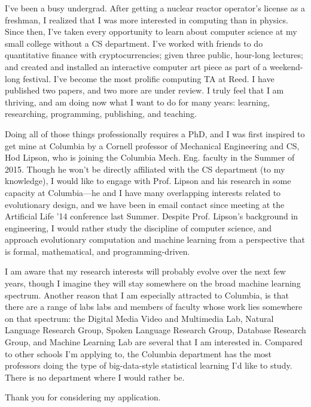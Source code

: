\documentclass{article}
\begin{document}
I've been a busy undergrad. After getting a nuclear reactor operator's license as a freshman, I realized that I was more interested in computing than in physics. Since then, I've taken every opportunity to learn about computer science at my small college without a CS department. I've worked with friends to do quantitative finance with cryptocurrencies; given three public, hour-long lectures; and created and installed an interactive computer art piece as part of a weekend-long festival. I've become the most prolific computing TA at Reed. I have published two papers, and two more are under review. I truly feel that I am thriving, and am doing now what I want to do for many years: learning, researching, programming, publishing, and teaching.

Doing all of those things professionally requires a PhD, and I was first inspired to get mine at Columbia by a Cornell professor of Mechanical Engineering and CS, Hod Lipson, who is joining the Columbia Mech. Eng. faculty in the Summer of 2015. Though he won't be directly affiliated with the CS department (to my knowledge), I would like to engage with Prof. Lipson and his research in some capacity at Columbia---he and I have many overlapping interests related to evolutionary design, and we have been in email contact since meeting at the Artificial Life '14 conference last Summer. Despite Prof. Lipson's background in engineering, I would rather study the discipline of computer science, and approach evolutionary computation and machine learning from a perspective that is formal, mathematical, and programming-driven. 

I am aware that my research interests will probably evolve over the next few years, though I imagine they will stay somewhere on the broad machine learning spectrum. Another reason that I am especially attracted to Columbia, is that there are a range of labs labs and members of faculty whose work lies somewhere on that spectrum: the Digital Media Video and Multimedia Lab, Natural Language Research Group, Spoken Language Research Group, Database Research Group, and Machine Learning Lab are several that I am interested in. Compared to other schools I'm applying to, the Columbia department has the most professors doing the type of big-data-style statistical learning I'd like to study. There is no department where I would rather be.

Thank you for considering my application.
\end{document}

